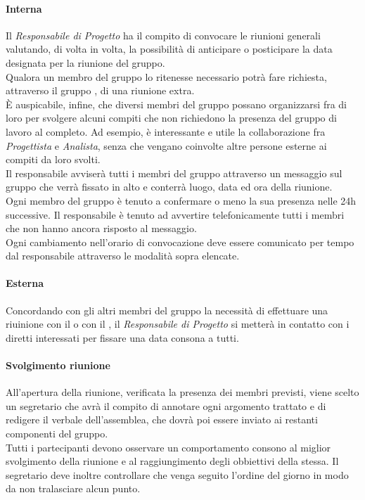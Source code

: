         \paragraph{Interna}
          Il \emph{Responsabile di Progetto} ha il compito di convocare le riunioni generali valutando, di volta in volta, la possibilità di anticipare o posticipare la data
          designata per la riunione del gruppo.\\
          Qualora un membro del gruppo lo ritenesse necessario potrà fare richiesta, attraverso il gruppo \textbf{}, di una riunione extra.\\
          È auspicabile, infine, che diversi membri del gruppo possano organizzarsi fra di loro per svolgere alcuni compiti che non richiedono la presenza  del gruppo di lavoro
          al completo. Ad esempio, è interessante e utile la collaborazione fra \emph{Progettista} e \emph{Analista}, senza che vengano coinvolte altre persone esterne ai compiti
          da loro svolti.\\
          Il responsabile avviserà tutti i membri del gruppo attraverso un messaggio sul gruppo \textbf{} che verrà fissato in alto e conterrà luogo, data ed ora della riunione.\\
          Ogni membro del gruppo è tenuto a confermare o meno la sua presenza nelle 24h successive. Il responsabile è tenuto ad avvertire telefonicamente tutti i membri che
          non hanno ancora risposto al messaggio.\\
          Ogni cambiamento nell'orario di convocazione deve essere comunicato per tempo dal responsabile attraverso le modalità sopra elencate.
        \paragraph{Esterna}
          Concordando con gli altri membri del gruppo la necessità di effettuare una riuinione con il  o con il , il \emph{Responsabile di Progetto}
          si metterà in contatto con i diretti interessati per fissare una data consona a tutti.
        \paragraph{Svolgimento riunione}
          All’apertura della riunione, verificata la presenza dei membri previsti, viene scelto un segretario che avrà il compito di annotare ogni argomento trattato e di redigere il verbale
          dell’assemblea, che dovrà poi essere inviato ai restanti componenti del gruppo.\\
          Tutti i partecipanti devono osservare un comportamento consono al miglior svolgimento della riunione e al raggiungimento degli obbiettivi della stessa. Il segretario deve inoltre
          controllare che venga seguito l’ordine del giorno in modo da non tralasciare alcun punto.
